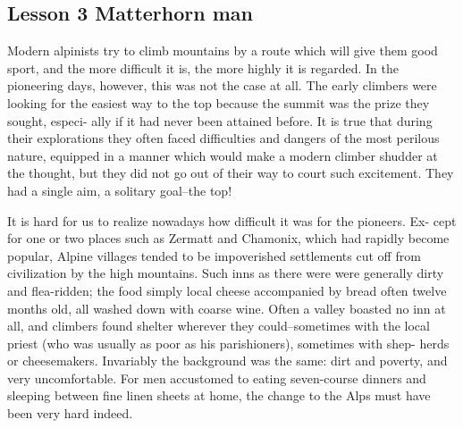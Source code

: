 \documentclass[kindlepaper]{BHCexam4kindle}
\begin{document}
\subsection{Lesson 3
Matterhorn man}
\par
Modern alpinists try to climb mountains by a route which will give them good
sport, and the more difficult it is, the more highly it is regarded. In the pioneering
days, however, this was not the case at all. The early climbers were looking for
the easiest way to the top because the summit was the prize they sought, especi-
ally if it had never been attained before. It is true that during their explorations
they often faced difficulties and dangers of the most perilous nature, equipped
in a manner which would make a modern climber shudder at the thought, but
they did not go out of their way to court such excitement. They had a single aim,
a solitary goal--the top!
\par
It is hard for us to realize nowadays how difficult it was for the pioneers. Ex-
cept for one or two places such as Zermatt and Chamonix, which had rapidly
become popular, Alpine villages tended to be impoverished settlements cut off
from civilization by the high mountains. Such inns as there were were generally
dirty and flea-ridden; the food simply local cheese accompanied by bread often
twelve months old, all washed down with coarse wine. Often a valley boasted no
inn at all, and climbers found shelter wherever they could--sometimes with the
local priest (who was usually as poor as his parishioners), sometimes with shep-
herds or cheesemakers. Invariably the background was the same: dirt and
poverty, and very uncomfortable. For men accustomed to eating seven-course
dinners and sleeping between fine linen sheets at home, the change to the Alps
must have been very hard indeed.
\clearpage
\end{document}
